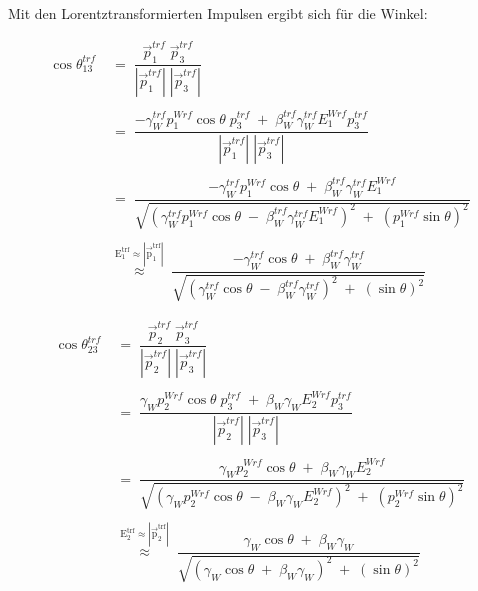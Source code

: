 \documentclass[
a4paper,                                %
twoside,                                %
BCOR1.4cm,                      %
ngerman,                                %
10pt,                           %
headings=normal,                %
headsepline,                    %
clearplainpage, %
final,                                  %
div=14,
parskip=full
]{scrbook}
\begin{document}
Mit den Lorentztransformierten Impulsen ergibt sich f\"ur die Winkel:

\begin{align}
	\cos \theta_{13}^{trf}
\;&=\;
	\dfrac{\vec{p}_{1}^{trf}\;\vec{p}_{3}^{trf}}
	{|\vec{p}_{1}^{trf}|\;|\vec{p}_{3}^{trf}|}
\nonumber
\\
\nonumber
\\
\;&=\;
	\dfrac{-\gamma_{W}^{trf} p_{1}^{Wrf} \cos \theta\; p_{3}^{trf}
	\;+\;\beta_{W}^{trf} \gamma_{W}^{trf} E_{1}^{Wrf} p_{3}^{trf}}
	{|\vec{p}_{1}^{trf}|\;|\vec{p}_{3}^{trf}|}
\nonumber
\\
\nonumber
\\
\;&=\;
	\dfrac{-\gamma_{W}^{trf} p_{1}^{Wrf} \cos \theta
	\;+\;\beta_{W}^{trf} \gamma_{W}^{trf} E_{1}^{Wrf}}
	{\sqrt{\left( \gamma_{W}^{trf} p_{1}^{Wrf} \cos \theta
	\;-\;\beta_{W}^{trf} \gamma_{W}^{trf} E_{1}^{Wrf} \right)^{2}
	\;+\;\left( p_{1}^{Wrf} \sin \theta \right)^{2}}}
\nonumber
\\
\nonumber
\\
\;&\stackrel{\mathrm{E_{1}^{trf}\approx |\vec{p}_{1}^{trf}|}}\approx\;
	\dfrac{-\gamma_{W}^{trf} \cos \theta
	\;+\;\beta_{W}^{trf} \gamma_{W}^{trf} }
	{\sqrt{\left( \gamma_{W}^{trf} \cos \theta
	\;-\;\beta_{W}^{trf} \gamma_{W}^{trf} \right)^{2}
	\;+\;\left( \sin \theta \right)^{2}}}
\nonumber
\end{align}

\begin{align}
	\cos \theta_{23}^{trf}
\;&=\;
	\dfrac{\vec{p}_{2}^{trf}\;\vec{p}_{3}^{trf}}
	{|\vec{p}_{2}^{trf}|\;|\vec{p}_{3}^{trf}|}
\nonumber
\\
\nonumber
\\
\;&=\;
	\dfrac{\gamma_{W} p_{2}^{Wrf} \cos \theta\; p_{3}^{trf}
	\;+\;\beta_{W} \gamma_{W} E_{2}^{Wrf} p_{3}^{trf}}
	{|\vec{p}_{2}^{trf}|\;|\vec{p}_{3}^{trf}|}
\nonumber
\\
\nonumber
\\
\;&=\;
	\dfrac{\gamma_{W} p_{2}^{Wrf} \cos \theta
	\;+\;\beta_{W} \gamma_{W} E_{2}^{Wrf}}
	{\sqrt{\left( \gamma_{W} p_{2}^{Wrf} \cos \theta 
	\;-\;\beta_{W} \gamma_{W} E_{2}^{Wrf} \right)^{2}
	\;+\;\left( p_{2}^{Wrf} \sin \theta \right)^{2}}}
\nonumber
\\
\nonumber
\\
\;&\stackrel{\mathrm{E_{2}^{trf}\approx |\vec{p}_{2}^{trf}|}}\approx\;
	\dfrac{\gamma_{W} \cos \theta
	\;+\;\beta_{W} \gamma_{W} }
	{\sqrt{\left( \gamma_{W} \cos \theta
	\;+\;\beta_{W} \gamma_{W} \right)^{2}
	\;+\;\left( \sin \theta \right)^{2}}}
\nonumber
\\
\nonumber
\end{align}
\end{document}
